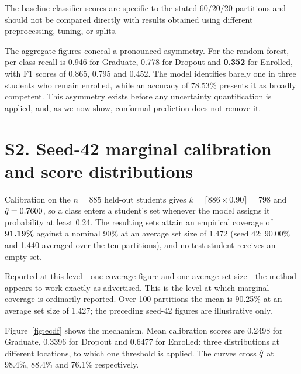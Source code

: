 The baseline classifier scores are specific to the stated 60/20/20
partitions and should not be compared directly with results obtained
using different preprocessing, tuning, or splits.

The aggregate figures conceal a pronounced asymmetry. For the random forest,
per-class recall is 0.946 for \textsf{Graduate}, 0.778 for \textsf{Dropout} and
\textbf{0.352} for \textsf{Enrolled}, with F1 scores of 0.865, 0.795 and 0.452.
The model identifies barely one in three students who remain enrolled, while an
accuracy of 78.53\% presents it as broadly competent. This asymmetry exists
before any uncertainty quantification is applied, and, as we now show,
conformal prediction does not remove it.


\section*{S2. Seed-42 marginal calibration and score distributions}


Calibration on the $n = 885$ held-out students gives
$k = \lceil 886 \times 0.90 \rceil = 798$ and $\hat{q} = 0.7600$, so a class
enters a student's set whenever the model assigns it probability at least 0.24.
The resulting sets attain an empirical coverage of \textbf{91.19\%} against a
nominal 90\% at an average set size of 1.472 (seed 42; 90.00\% and 1.440
averaged over the ten partitions), and no test student receives an empty set.

Reported at this level---one coverage figure and one average set size---the
method appears to work exactly as advertised. This is the level at which
marginal coverage is ordinarily reported. Over 100 partitions the mean is
90.25\% at an average set size of 1.427; the preceding seed-42
figures are illustrative only.


Figure~\ref{fig:ecdf} shows the mechanism. Mean calibration scores are 0.2498
for \textsf{Graduate}, 0.3396 for \textsf{Dropout} and 0.6477 for
\textsf{Enrolled}: three distributions at different locations, to which one
threshold is applied. The curves cross $\hat{q}$ at 98.4\%, 88.4\% and 76.1\%
respectively.

